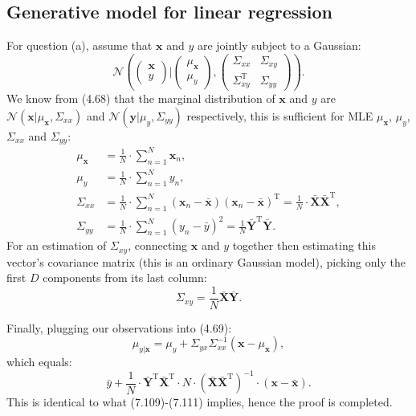 \documentclass[UTF8]{ctexart}
\begin{document}
\subsection{Generative model for linear regression}
For question (a), assume that $\textbf{x}$ and $y$ are jointly subject to a Gaussian:
$$\mathcal{N}\left(\begin{pmatrix}\textbf{x}\\ y \end{pmatrix}|
\begin{pmatrix}\mu_{\textbf{x}}\\ \mu_{y} \end{pmatrix},
  \begin{pmatrix}\Sigma_{xx} & \Sigma_{xy} \\
                 \Sigma_{xy}^{\text{T}} & \Sigma_{yy} \end{pmatrix}
 \right).$$
We know from (4.68) that the marginal distribution of $\textbf{x}$ and $y$ are $\mathcal{N}(\textbf{x}|\mu_{\textbf{x}},\Sigma_{xx})$ and $\mathcal{N}(\textbf{y}|\mu_{y},\Sigma_{yy})$ respectively, this is sufficient for MLE $\mu_{\textbf{x}}$, $\mu_{y}$, $\Sigma_{xx}$ and $\Sigma_{yy}$:
$$
\begin{aligned}
\mu_{\textbf{x}}&=\frac{1}{N}\cdot\sum_{n=1}^{N}\textbf{x}_{n},\\
\mu_{y}&=\frac{1}{N}\cdot\sum_{n=1}^{N}y_{n},\\
\Sigma_{xx}&=\frac{1}{N}\cdot\sum_{n=1}^{N}(\textbf{x}_{n}-\bar{\textbf{x}})(\textbf{x}_{n}-\bar{\textbf{x}})^{\text{T}}=\frac{1}{N}\cdot\bar{\textbf{X}}\bar{\textbf{X}}^{\text{T}},\\
\Sigma_{yy}&=\frac{1}{N}\cdot\sum_{n=1}^{N}(y_{n}-\bar{y})^{2}=\frac{1}{N}\bar{\textbf{Y}}^{\text{T}}\bar{\textbf{Y}}.
\end{aligned}
$$
For an estimation of $\Sigma_{xy}$, connecting $\textbf{x}$ and $y$ together then estimating this vector's covariance matrix (this is an ordinary Gaussian model), picking only the first $D$ components from its last column:
$$\Sigma_{xy}=\frac{1}{N}\bar{\textbf{X}}\bar{\textbf{Y}}.$$

Finally, plugging our observations into (4.69):
$$\mu_{y|\textbf{x}}=\mu_{y}+\Sigma_{yx}\Sigma^{-1}_{xx}(\textbf{x}-\mu_{\textbf{x}}),$$
which equals:
$$\bar{y}+\frac{1}{N}\cdot\bar{\textbf{Y}}^{\text{T}}\bar{\textbf{X}}^{\text{T}}\cdot N\cdot (\bar{\textbf{X}}\bar{\textbf{X}}^{\text{T}})^{-1}\cdot(\textbf{x}-\bar{\textbf{x}}).$$
This is identical to what (7.109)-(7.111) implies, hence the proof is completed.
\end{document}
